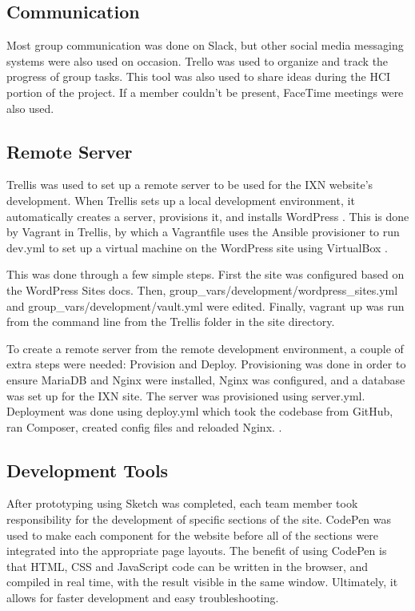 \documentclass[fontsize=10pt]{extarticle}
\numberwithin{figure}{section} %
\begin{document}
\hypertarget{communication}{%
\subsection{Communication}\label{communication}}

Most group communication was done on Slack, but other social media
messaging systems were also used on occasion. Trello was used to
organize and track the progress of group tasks. This tool was also used
to share ideas during the HCI portion of the project. If a member
couldn't be present, FaceTime meetings were also used.

\hypertarget{remote-server}{%
\subsection{Remote Server}\label{remote-server}}

Trellis was used to set up a remote server to be used for the IXN
website's development. When Trellis sets up a local development
environment, it automatically creates a server, provisions it, and
installs WordPress \cite{p21} . This is done by Vagrant in Trellis, by
which a Vagrantfile uses the Ansible provisioner to run dev.yml to set
up a virtual machine on the WordPress site using VirtualBox \cite{p22} .

This was done through a few simple steps. First the site was configured
based on the WordPress Sites docs. Then,
group\_vars/development/wordpress\_sites.yml and
group\_vars/development/vault.yml were edited. Finally, vagrant up was
run from the command line from the Trellis folder in the site directory.

To create a remote server from the remote development environment, a
couple of extra steps were needed: Provision and Deploy. Provisioning
was done in order to ensure MariaDB and Nginx were installed, Nginx was
configured, and a database was set up for the IXN site. The server was
provisioned using server.yml. Deployment was done using deploy.yml which
took the codebase from GitHub, ran Composer, created config files and
reloaded Nginx. \cite{p23}.

\hypertarget{development-tools}{%
\subsection{Development Tools}\label{development-tools}}

After prototyping using Sketch was completed, each team member took
responsibility for the development of specific sections of the site.
CodePen was used to make each component for the website before all of
the sections were integrated into the appropriate page layouts. The
benefit of using CodePen is that HTML, CSS and JavaScript code can be
written in the browser, and compiled in real time, with the result
visible in the same window. \cite{p19} Ultimately, it allows for faster
development and easy troubleshooting.
\end{document}
